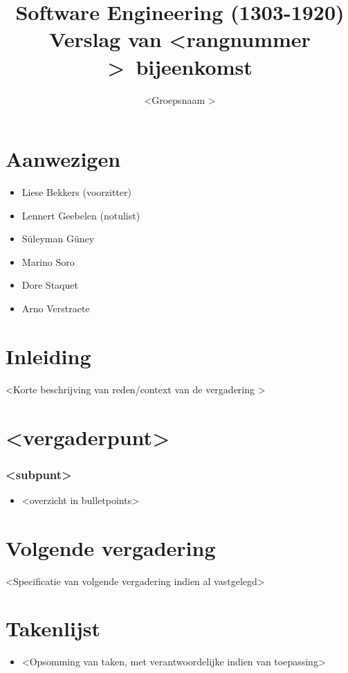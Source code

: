 \documentclass{article}
\title{Software Engineering (1303-1920)\\Verslag van \textless rangnummer \textgreater \ bijeenkomst}
\author{\textless Groepsnaam \textgreater}
\date{}
\begin{document}
\maketitle

\section*{Aanwezigen}
\begin{itemize}
    \item Liese Bekkers (voorzitter)
    \item Lennert Geebelen (notulist)
    \item S\"uleyman G\"uney
    \item Marino Soro
    \item Dore Staquet
    \item Arno Verstraete
\end{itemize}

\section*{Inleiding}
\textless Korte beschrijving van reden/context van de vergadering \textgreater

\section*{\textless vergaderpunt\textgreater}
\subsubsection*{\textless subpunt\textgreater}
\begin{itemize}
    \item \textless overzicht in bulletpoints\textgreater
\end{itemize}

\section*{Volgende vergadering}
\textless Specificatie van volgende vergadering indien al vastgelegd\textgreater

\section*{Takenlijst}
\begin{itemize}
	\item \textless Opsomming van taken, met verantwoordelijke indien van toepassing\textgreater
\end{itemize}
\end{document}
